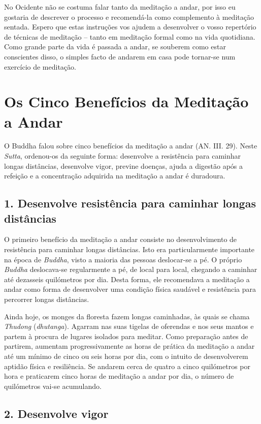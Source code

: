 No Ocidente não se costuma falar tanto da meditação a andar, por isso eu
gostaria de descrever o processo e recomendá-la como complemento à
meditação sentada. Espero que estas instruções vos ajudem a desenvolver
o vosso repertório de técnicas de meditação -- tanto em meditação formal
como na vida quotidiana. Como grande parte da vida é passada a andar, se
souberem como estar conscientes disso, o simples facto de andarem em
casa pode tornar-se num exercício de meditação.

\section{Os Cinco Benefícios da Meditação a Andar}

O Buddha falou sobre cinco benefícios da meditação a andar (AN. III. 29). Neste
\emph{Sutta}, ordenou-os da seguinte forma: desenvolve a resistência para
caminhar longas distâncias, desenvolve vigor, previne doenças, ajuda a digestão
após a refeição e a concentração adquirida na meditação a andar é duradoura.

\subsection{1. Desenvolve resistência para caminhar longas distâncias}

O primeiro benefício da meditação a andar consiste no desenvolvimento de
resistência para caminhar longas distâncias. Isto era particularmente
importante na época de \emph{Buddha}, visto a maioria das pessoas
deslocar-se a pé. O próprio \emph{Buddha} deslocava-se regularmente a
pé, de local para local, chegando a caminhar até dezasseis quilómetros
por dia. Desta forma, ele recomendava a meditação a andar como forma de
desenvolver uma condição física saudável e resistência para percorrer
longas distâncias.

Ainda hoje, os monges da floresta fazem longas caminhadas, às quais se
chama \emph{Thudong} (\emph{dhutanga}). Agarram nas suas tigelas de
oferendas e nos seus mantos e partem à procura de lugares isolados para
meditar. Como preparação antes de partirem, aumentam progressivamente as
horas de prática da meditação a andar até um mínimo de cinco ou seis
horas por dia, com o intuito de desenvolverem aptidão física e
resiliência. Se andarem cerca de quatro a cinco quilómetros por hora e
praticarem cinco horas de meditação a andar por dia, o número de
quilómetros vai-se acumulando.

\subsection{2. Desenvolve vigor}

